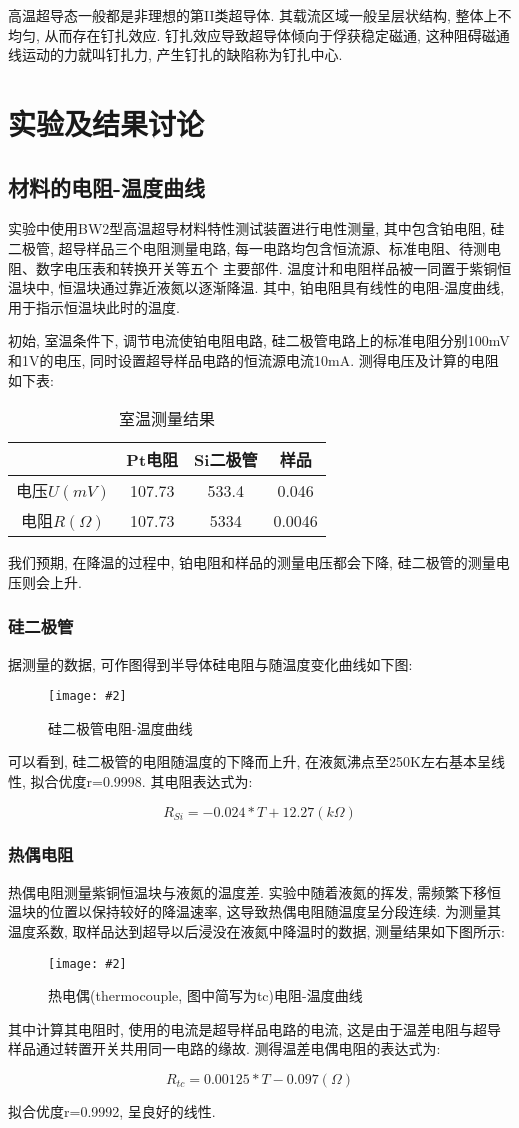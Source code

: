 \documentclass[12pt,a4paper]{article}
\newcommand{\be}[1]{
    \begin{equation}
        #1
    \end{equation}
}
\newcommand{\bfig}[3]{
    \begin{figure}[H]
        \centering
        \texttt{[image: \#2]}
        \caption{#3}
    \end{figure}
}
\begin{document}
高温超导态一般都是非理想的第II类超导体. 其载流区域一般呈层状结构, 整体上不均匀, 从而存在钉扎效应. 钉扎效应导致超导体倾向于俘获稳定磁通, 这种阻碍磁通线运动的力就叫钉扎力, 产生钉扎的缺陷称为钉扎中心. 
\section{实验及结果讨论}
\subsection{材料的电阻-温度曲线}
实验中使用BW2型高温超导材料特性测试装置进行电性测量, 其中包含铂电阻, 硅二极管, 超导样品三个电阻测量电路, 每一电路均包含恒流源、标准电阻、待测电阻、数字电压表和转换开关等五个
主要部件. 温度计和电阻样品被一同置于紫铜恒温块中, 恒温块通过靠近液氮以逐渐降温. 其中, 铂电阻具有线性的电阻-温度曲线, 用于指示恒温块此时的温度. 

初始, 室温条件下, 调节电流使铂电阻电路, 硅二极管电路上的标准电阻分别100mV和1V的电压, 同时设置超导样品电路的恒流源电流10mA. 测得电压及计算的电阻如下表: 
\begin{table}[H]
    \centering
    \begin{tabular}{|c|c|c|c|}
    \hline
             & Pt电阻   & Si二极管 & 样品     \\ \hline
    电压$U(mV)$  & 107.73 & 533.4 & 0.046  \\ \hline
    电阻$R(\Omega)$ & 107.73 & 5334  & 0.0046 \\ \hline
    \end{tabular}
    \caption{室温测量结果}
    \end{table}
我们预期, 在降温的过程中, 铂电阻和样品的测量电压都会下降, 硅二极管的测量电压则会上升. 
\subsubsection{硅二极管}
据测量的数据, 可作图得到半导体硅电阻与随温度变化曲线如下图:
\bfig{0.8}{rsi.jpg}{硅二极管电阻-温度曲线}
可以看到, 硅二极管的电阻随温度的下降而上升, 在液氮沸点至250K左右基本呈线性, 拟合优度r=0.9998. 
其电阻表达式为: 
\be{R_{Si}=-0.024*T+12.27(k\Omega)}
\subsubsection{热偶电阻}
热偶电阻测量紫铜恒温块与液氮的温度差. 实验中随着液氮的挥发, 需频繁下移恒温块的位置以保持较好的降温速率, 这导致热偶电阻随温度呈分段连续. 
为测量其温度系数, 取样品达到超导以后浸没在液氮中降温时的数据, 测量结果如下图所示: 
\bfig{0.8}{rtc.jpg}{热电偶(thermocouple, 图中简写为tc)电阻-温度曲线}
其中计算其电阻时, 使用的电流是超导样品电路的电流, 这是由于温差电阻与超导样品通过转置开关共用同一电路的缘故. 
测得温差电偶电阻的表达式为: 
\be{R_{tc}=0.00125*T-0.097(\Omega)}
拟合优度r=0.9992, 呈良好的线性. 
\end{document}
